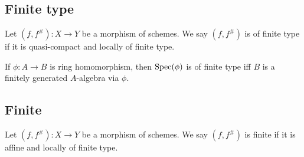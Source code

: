 \documentclass{memoir}
\begin{document}
\subsection{Finite type}
\begin{definition}
    Let $(f,f^\#):X\to Y$ be a morphism of schemes.
    We say $(f,f^\#)$ is of finite type if it is quasi-compact and locally of finite type.
\end{definition}
\begin{remark}
    If $\phi:A\to B$ is ring homomorphism, then $\operatorname{Spec}(\phi)$ is of finite type iff $B$ is a finitely generated $A$-algebra via $\phi$.
\end{remark}
\subsection{Finite}
\begin{definition}
    Let $(f,f^\#):X\to Y$ be a morphism of schemes.
    We say $(f,f^\#)$ is finite if it is affine and locally of finite type.
\end{definition}
\end{document}
